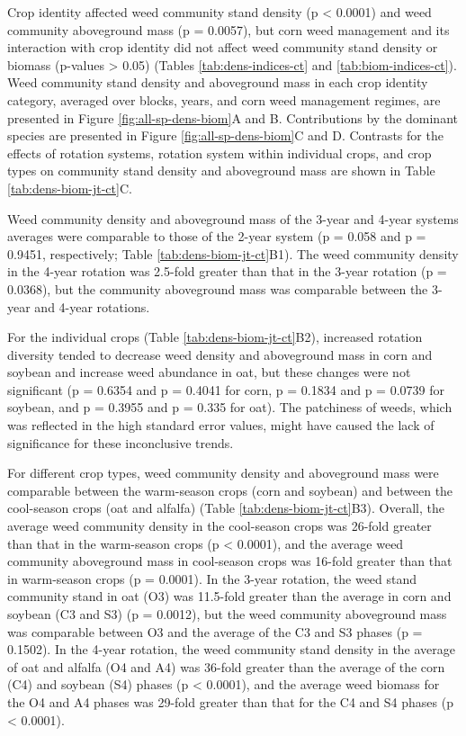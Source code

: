 \documentclass[
]{article}
\begin{document}
Crop identity affected weed community stand density (p \textless{} 0.0001) and weed community aboveground mass (p = 0.0057), but corn weed management and its interaction with crop identity did not affect weed community stand density or biomass (p-values \textgreater{} 0.05) (Tables \ref{tab:dens-indices-ct} and \ref{tab:biom-indices-ct}). Weed community stand density and aboveground mass in each crop identity category, averaged over blocks, years, and corn weed management regimes, are presented in Figure \ref{fig:all-sp-dens-biom}A and B. Contributions by the dominant species are presented in Figure \ref{fig:all-sp-dens-biom}C and D. Contrasts for the effects of rotation systems, rotation system within individual crops, and crop types on community stand density and aboveground mass are shown in Table \ref{tab:dens-biom-jt-ct}C.

Weed community density and aboveground mass of the 3-year and 4-year systems averages were comparable to those of the 2-year system (p = 0.058 and p = 0.9451, respectively; Table \ref{tab:dens-biom-jt-ct}B1). The weed community density in the 4-year rotation was 2.5-fold greater than that in the 3-year rotation (p = 0.0368), but the community aboveground mass was comparable between the 3-year and 4-year rotations.

For the individual crops (Table \ref{tab:dens-biom-jt-ct}B2), increased rotation diversity tended to decrease weed density and aboveground mass in corn and soybean and increase weed abundance in oat, but these changes were not significant (p = 0.6354 and p = 0.4041 for corn, p = 0.1834 and p = 0.0739 for soybean, and p = 0.3955 and p = 0.335 for oat). The patchiness of weeds, which was reflected in the high standard error values, might have caused the lack of significance for these inconclusive trends.

For different crop types, weed community density and aboveground mass were comparable between the warm-season crops (corn and soybean) and between the cool-season crops (oat and alfalfa) (Table \ref{tab:dens-biom-jt-ct}B3). Overall, the average weed community density in the cool-season crops was 26-fold greater than that in the warm-season crops (p \textless{} 0.0001), and the average weed community aboveground mass in cool-season crops was 16-fold greater than that in warm-season crops (p = 0.0001). In the 3-year rotation, the weed stand community stand in oat (O3) was 11.5-fold greater than the average in corn and soybean (C3 and S3) (p = 0.0012), but the weed community aboveground mass was comparable between O3 and the average of the C3 and S3 phases (p = 0.1502). In the 4-year rotation, the weed community stand density in the average of oat and alfalfa (O4 and A4) was 36-fold greater than the average of the corn (C4) and soybean (S4) phases (p \textless{} 0.0001), and the average weed biomass for the O4 and A4 phases was 29-fold greater than that for the C4 and S4 phases (p \textless{} 0.0001).
\end{document}
